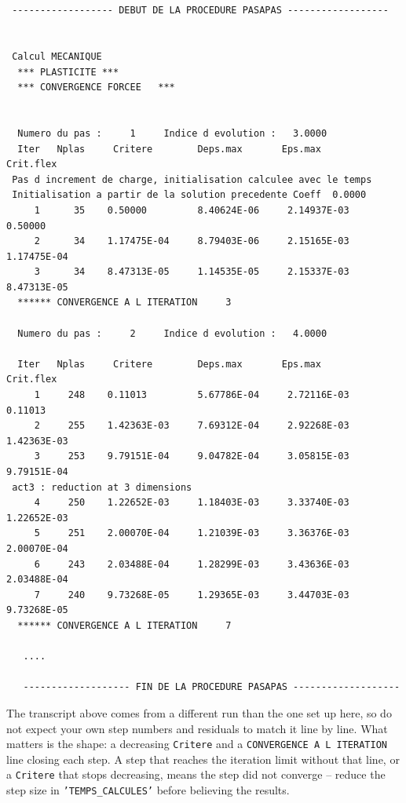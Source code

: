 \begin{codebox}\footnotesize
\begin{verbatim}

 
 ------------------ DEBUT DE LA PROCEDURE PASAPAS ------------------
 
 
 Calcul MECANIQUE
  *** PLASTICITE ***
  *** CONVERGENCE FORCEE   ***
 
 
  Numero du pas :     1     Indice d evolution :   3.0000
  Iter   Nplas     Critere        Deps.max       Eps.max      Crit.flex
 Pas d increment de charge, initialisation calculee avec le temps
 Initialisation a partir de la solution precedente Coeff  0.0000
     1      35    0.50000         8.40624E-06     2.14937E-03     0.50000
     2      34    1.17475E-04     8.79403E-06     2.15165E-03     1.17475E-04
     3      34    8.47313E-05     1.14535E-05     2.15337E-03     8.47313E-05
  ****** CONVERGENCE A L ITERATION     3
   
  Numero du pas :     2     Indice d evolution :   4.0000
 
  Iter   Nplas     Critere        Deps.max       Eps.max      Crit.flex
     1     248    0.11013         5.67786E-04     2.72116E-03     0.11013
     2     255    1.42363E-03     7.69312E-04     2.92268E-03     1.42363E-03
     3     253    9.79151E-04     9.04782E-04     3.05815E-03     9.79151E-04
 act3 : reduction at 3 dimensions
     4     250    1.22652E-03     1.18403E-03     3.33740E-03     1.22652E-03
     5     251    2.00070E-04     1.21039E-03     3.36376E-03     2.00070E-04
     6     243    2.03488E-04     1.28299E-03     3.43636E-03     2.03488E-04
     7     240    9.73268E-05     1.29365E-03     3.44703E-03     9.73268E-05
  ****** CONVERGENCE A L ITERATION     7
   
   ....
   
   ------------------- FIN DE LA PROCEDURE PASAPAS -------------------
\end{verbatim}
\end{codebox}

\noindent The transcript above comes from a different run than the one set up
here, so do not expect your own step numbers and residuals to match it line
by line. What matters is the shape: a decreasing \texttt{Critere} and a
\texttt{CONVERGENCE A L ITERATION} line closing each step. A step that
reaches the iteration limit without that line, or a \texttt{Critere} that
stops decreasing, means the step did not converge -- reduce the step size in
\texttt{'TEMPS\_CALCULES'} before believing the results.


